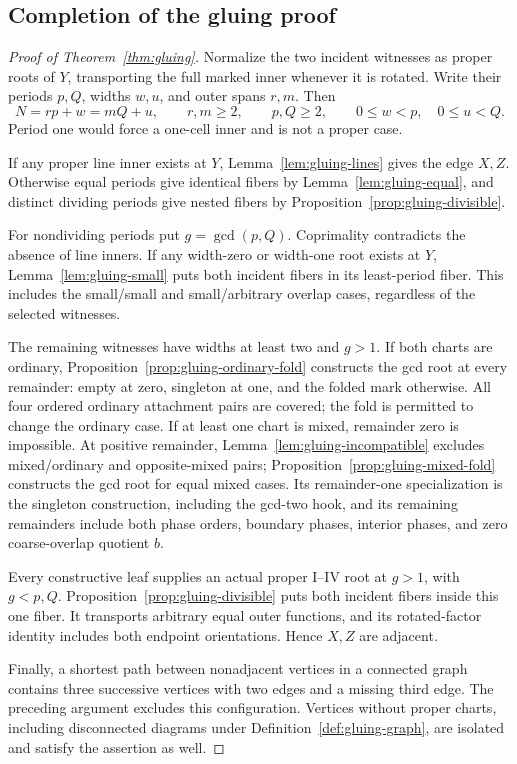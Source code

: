 \documentclass[11pt,a4paper]{amsart}
\numberwithin{equation}{section}
\theoremstyle{plain}
\theoremstyle{definition}
\begin{document}
\subsection{Completion of the gluing proof}

\begin{proof}[Proof of Theorem~\ref{thm:gluing}]
Normalize the two incident witnesses as proper roots of \(Y\), transporting the full marked inner whenever it is rotated.  Write their periods \(p,Q\), widths \(w,u\), and outer spans \(r,m\).  Then
\begin{equation*}
 N=rp+w=mQ+u,\qquad r,m\ge2,\qquad
 p,Q\ge2,\qquad0\le w<p,\quad0\le u<Q.
\end{equation*}
Period one would force a one-cell inner and is not a proper case.

If any proper line inner exists at \(Y\), Lemma~\ref{lem:gluing-lines} gives the edge \(X,Z\).  Otherwise equal periods give identical fibers by Lemma~\ref{lem:gluing-equal}, and distinct dividing periods give nested fibers by Proposition~\ref{prop:gluing-divisible}.

For nondividing periods put \(g=\gcd(p,Q)\).  Coprimality contradicts the absence of line inners.  If any width-zero or width-one root exists at \(Y\), Lemma~\ref{lem:gluing-small} puts both incident fibers in its least-period fiber.  This includes the small/small and small/arbitrary overlap cases, regardless of the selected witnesses.

The remaining witnesses have widths at least two and \(g>1\).  If both charts are ordinary, Proposition~\ref{prop:gluing-ordinary-fold} constructs the gcd root at every remainder: empty at zero, singleton at one, and the folded mark otherwise.  All four ordered ordinary attachment pairs are covered; the fold is permitted to change the ordinary case.  If at least one chart is mixed, remainder zero is impossible.  At positive remainder, Lemma~\ref{lem:gluing-incompatible} excludes mixed/ordinary and opposite-mixed pairs; Proposition~\ref{prop:gluing-mixed-fold} constructs the gcd root for equal mixed cases.  Its remainder-one specialization is the singleton construction, including the gcd-two hook, and its remaining remainders include both phase orders, boundary phases, interior phases, and zero coarse-overlap quotient \(b\).

Every constructive leaf supplies an actual proper I--IV root at \(g>1\), with \(g<p,Q\).  Proposition~\ref{prop:gluing-divisible} puts both incident fibers inside this one fiber.  It transports arbitrary equal outer functions, and its rotated-factor identity includes both endpoint orientations.  Hence \(X,Z\) are adjacent.

Finally, a shortest path between nonadjacent vertices in a connected graph contains three successive vertices with two edges and a missing third edge.  The preceding argument excludes this configuration.  Vertices without proper charts, including disconnected diagrams under Definition~\ref{def:gluing-graph}, are isolated and satisfy the assertion as well.
\end{proof}
\end{document}
